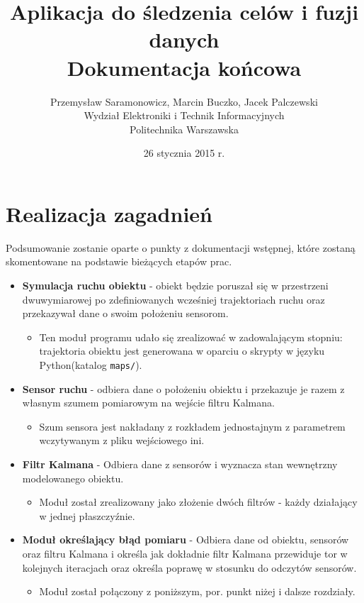 \documentclass{article}
\title{Aplikacja do śledzenia celów i fuzji danych  \\ {\large Dokumentacja końcowa}}
\author{Przemysław Saramonowicz, Marcin Buczko, Jacek Palczewski \\ Wydział Elektroniki i Technik Informacyjnych \\ Politechnika Warszawska}
\date{26 stycznia 2015 r.}
\begin{document}
	\maketitle
	
	\section{Realizacja zagadnień}
		Podsumowanie zostanie oparte o punkty z dokumentacji wstępnej, które zostaną skomentowane na podstawie bieżących etapów prac.	
		\begin{itemize}
		\item \textbf{Symulacja ruchu obiektu} - obiekt będzie poruszał się w przestrzeni dwuwymiarowej po zdefiniowanych wcześniej trajektoriach ruchu oraz przekazywał dane o swoim położeniu sensorom.
		\begin{itemize}
			\item Ten moduł programu udało się zrealizować w zadowalającym stopniu: trajektoria obiektu jest generowana w oparciu o skrypty w języku Python(katalog \texttt{maps/}).
		\end{itemize}

		\item \textbf{Sensor ruchu} - odbiera dane o położeniu obiektu i przekazuje je razem z własnym szumem pomiarowym na wejście filtru Kalmana.
			\begin{itemize}
				\item Szum sensora jest nakładany z rozkładem jednostajnym z parametrem wczytywanym z pliku wejściowego ini. 
			\end{itemize}

		\item \textbf{Filtr Kalmana} - Odbiera dane z sensorów i wyznacza stan wewnętrzny modelowanego obiektu. 
			\begin{itemize}
				\item Moduł został zrealizowany jako złożenie dwóch filtrów - każdy działający w jednej płaszczyźnie. 
			\end{itemize}
		
		\item \textbf{Moduł określający błąd pomiaru} - Odbiera dane od obiektu, sensorów oraz filtru Kalmana i określa jak dokładnie filtr Kalmana przewiduje tor w kolejnych iteracjach oraz określa poprawę w stosunku do odczytów sensorów.
			\begin{itemize}
				\item Moduł został połączony z poniższym, por. punkt niżej i dalsze rozdziały.
			\end{itemize}
				

\end{itemize}
\end{document}
